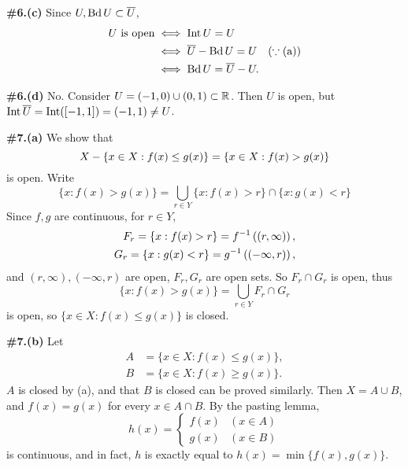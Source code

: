 \documentclass[a4paper,11pt]{article}
\begin{document}
\begin{minipage}[t][270mm]{90mm}
    {\bfseries \large \#6.(c)} Since \(U, \operatorname{Bd} U \subset \overline{U}\),
    \[
        \begin{aligned}
            U \text{ is open} & \iff \operatorname{Int} U = U                                       \\
                              & \iff \overline{U} - \operatorname{Bd} U  = U \quad (\because \text{(a)}) \\
                              & \iff \operatorname{Bd} U = \overline{U} - U.
        \end{aligned}
    \]
\end{minipage}
{\color{gray}\vline}
\begin{minipage}[t][270mm]{90mm}
    \phantom{?} {\bfseries \large \#6.(d)} No. Consider \(U = (-1, 0) \cup (0, 1) \subset \mathbb{R}\). Then \(U\) is open, but \(\operatorname{Int} \overline{U} = \operatorname{Int}([-1, 1]) = (-1, 1) \neq U\).
\end{minipage}

\newpage

\phantom{?}
\vspace{5mm}

\begin{minipage}[t][270mm]{90mm}
    {\bfseries \large \#7.(a)} We show that
    \[
        X - \{x \in X : f(x) \leq g(x) \} = \{x \in X: f(x) > g(x)\}
    \]
    is open. Write
    \[
        \{x : f(x) > g(x)\} = \bigcup_{r \in Y} \{x : f(x) > r\} \cap \{x : g(x) < r\}
    \]
    Since \(f, g\) are continuous, for \(r \in Y\),
    \[
        \begin{aligned}
            F_r = \{x : f(x) > r\} = f^{-1}\left( (r, \infty) \right), \\
            G_r = \{x : g(x) < r\} = g^{-1}\left( (-\infty, r) \right),
        \end{aligned}
    \]
    and \((r, \infty), (-\infty, r)\) are open, \(F_r, G_r\) are open sets. So \(F_r \cap G_r\) is open, thus
    \[
        \{x : f(x) > g(x)\} = \bigcup_{r \in Y} F_r \cap G_r
    \]
    is open, so \(\{x \in X : f(x) \leq g(x)\}\) is closed.
\end{minipage}
{\color{gray}\vline}
\begin{minipage}[t][270mm]{90mm}
    \phantom{?} {\bfseries \large \#7.(b)} Let
    \[
        \begin{aligned}
            A & = \{x \in X : f(x) \leq g(x)\}, \\
            B & = \{x \in X : f(x) \geq g(x)\}.
        \end{aligned}
    \]
    \(A\) is closed by (a), and that \(B\) is closed can be proved similarly. Then \(X = A \cup B\), and \(f(x) = g(x)\) for every \(x \in A \cap B\). By the pasting lemma,
    \[
        h(x) = \begin{cases}
            f(x) & (x\in A) \\ g(x) & (x \in B)
        \end{cases}
    \]
    is continuous, and in fact, \(h\) is exactly equal to \(h(x) = \min\{f(x), g(x)\}\).
\end{minipage}
\end{document}
